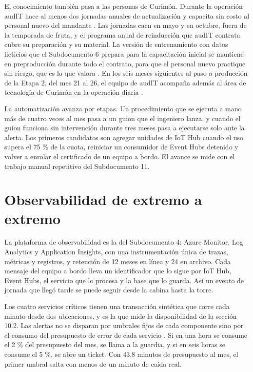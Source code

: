 El conocimiento también pasa a las personas de Curimón. Durante la operación audIT hace al menos dos
jornadas anuales de actualización y capacita sin costo al personal nuevo del mandante
. Las jornadas caen en mayo y en octubre, fuera de la temporada de fruta, y el
programa anual de reinducción que audIT contrata cubre su preparación y su material. La versión de
entrenamiento con datos ficticios que el Subdocumento 6 prepara para la capacitación inicial se mantiene
en preproducción durante todo el contrato, para que el personal nuevo practique sin riesgo, que es lo
que valora . En los seis meses siguientes al paso a producción de la Etapa 2, del
mes 21 al 26, el equipo de audIT acompaña además al área de tecnología de Curimón en la operación diaria
.

La automatización avanza por etapas. Un procedimiento que se ejecuta a mano más de cuatro veces al mes
pasa a un guion que el ingeniero lanza, y cuando el guion funciona sin intervención durante tres meses
pasa a ejecutarse solo ante la alerta. Los primeros candidatos son agregar unidades de IoT Hub cuando
el uso supera el 75 \% de la cuota, reiniciar un consumidor de Event Hubs detenido y volver a enrolar el
certificado de un equipo a bordo. El avance se mide con el trabajo manual repetitivo del Subdocumento
11.

\section{Observabilidad de extremo a extremo}\label{sec:10-observabilidad-de-extremo-a-extr}

La plataforma de observabilidad es la del Subdocumento 4: Azure Monitor, Log Analytics y Application
Insights, con una instrumentación única de trazas, métricas y registros, y retención de 12 meses en línea
y 24 en archivo. Cada mensaje del equipo a bordo lleva un identificador que lo sigue por IoT Hub, Event
Hubs, el servicio que lo procesa y la base que lo guarda. Así un evento de jornada que llegó tarde se
puede seguir desde la cabina hasta la torre.

Los cuatro servicios críticos tienen una transacción sintética que corre cada minuto desde dos
ubicaciones, y es la que mide la disponibilidad de la sección 10.2. Las alertas no se disparan por
umbrales fijos de cada componente sino por el consumo del presupuesto de error de cada servicio
\parencite{beyer2016}. Si en una hora se consume el 2 \% del presupuesto del mes, se llama a la guardia,
y si en seis horas se consume el 5 \%, se abre un ticket. Con 43,8 minutos de presupuesto al mes, el
primer umbral salta con menos de un minuto de caída real.

